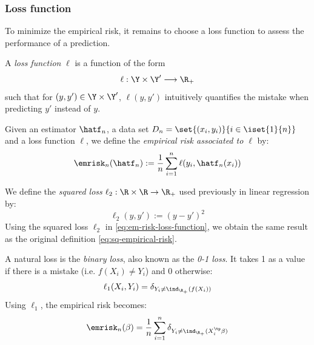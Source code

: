 \documentclass{../cs-classes/cs-classes}
\begin{document}
\subsubsection{Loss function}
To minimize the empirical risk, it remains to choose a loss function to assess the performance of a prediction. 

\begin{definition}
    A \emph{loss function} $\ell$ is a function of the form
    \begin{equation*}
        \ell : \Y\times\Y' \longrightarrow \R_+
    \end{equation*}
    such that for $(y, y')\in\Y\times\Y'$, $\ell(y, y')$ intuitively quantifies the mistake when predicting $y'$ instead of $y$. 
\end{definition}

\begin{definition}
    Given an estimator $\hatf_n$, a data set $D_n=\set{(x_i, y_i)}{i\in\iset{1}{n}}$ and a loss function $\ell$, we define the \emph{empirical risk associated to $\ell$} by:
    \begin{equation}
        \label{eq:em-risk-loss-function}
        \emrisk_n(\hatf_n) := \frac{1}{n}\sum_{i=1}^n \ell(y_i, \hatf_n(x_i))
    \end{equation}
\end{definition}

\begin{definition}
    We define the \emph{squared loss} $\ell_2:\R\times\R\to\R_+$ used previously in linear regression by:
    \begin{equation}
        \ell_2(y, y') := (y-y')^2
    \end{equation}
    Using the squared loss $\ell_2$ in \eqref{eq:em-risk-loss-function}, we obtain the same result as the original definition \eqref{eq:sq-empirical-risk}. 
\end{definition}

\begin{definition}
    A natural loss is the \emph{binary loss}, also known as the \emph{0-1 loss}. It takes 1 as a value if there is a mistake (i.e. $f(X_i)\neq Y_i$) and 0 otherwise:
    \begin{equation}
        \ell_{1}(X_i, Y_i) = \delta_{Y_i\neq\ind_{\R_+}(f(X_i))}
    \end{equation}
    Using $\ell_1$, the empirical risk becomes:
    \begin{equation*}
        \emrisk_n(\beta) = \frac{1}{n}\sum_{i=1}^n \delta_{Y_i\neq\ind_{\R_+}(X_i^\tp\beta)}
    \end{equation*}
\end{definition}
\end{document}
